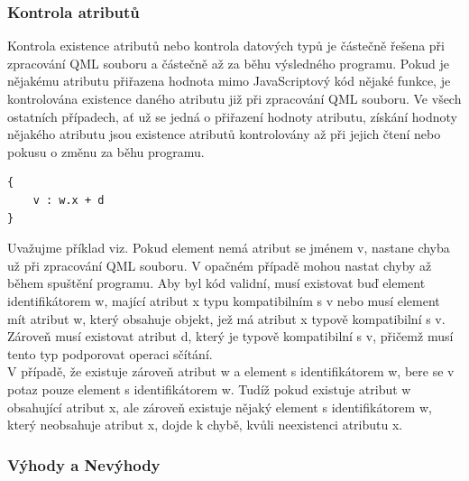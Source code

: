\documentclass[report,11pt]{elsarticle}
\begin{document}
\subsubsection{Kontrola atributů}
Kontrola existence atributů nebo kontrola datových typů je částečně řešena při zpracování QML souboru a částečně až za běhu výsledného programu. Pokud je nějakému atributu přiřazena hodnota mimo JavaScriptový kód nějaké funkce, je kontrolována existence daného atributu již při zpracování QML souboru. Ve všech ostatních případech, ať už se jedná o přiřazení hodnoty atributu, získání hodnoty nějakého atributu jsou existence atributů kontrolovány až při jejich čtení nebo pokusu o změnu za běhu programu.
\begin{lstlisting}[frame=single,caption=Ukázka použití komponenty z jiného souboru.]
{
	v : w.x + d
}
\end{lstlisting}
Uvažujme příklad viz. Pokud element nemá atribut se jménem v, nastane chyba už při zpracování QML souboru. V opačném případě mohou nastat chyby až během spuštění programu. Aby byl kód validní, musí existovat buď element identifikátorem w, mající atribut x typu kompatibilním s v nebo musí element mít atribut w, který obsahuje objekt, jež má atribut x typově kompatibilní s v. Zároveň musí existovat atribut d, který je typově kompatibilní s v, přičemž musí tento typ podporovat operaci sčítání.\\
V případě, že existuje zároveň atribut w a element s identifikátorem w, bere se v potaz pouze element s identifikátorem w. Tudíž pokud existuje atribut w obsahující atribut x, ale zároveň existuje nějaký element s identifikátorem w, který neobsahuje atribut x, dojde k chybě, kvůli neexistenci atributu x. 

\subsubsection{Výhody a Nevýhody}
\end{document}
